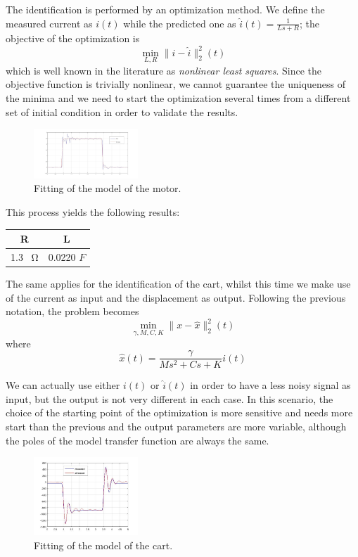 The identification is performed by an optimization method. We define the measured current as $i(t)$ while the predicted one as $\hat{i}(t) = \frac{1}{Ls+R}$; the objective of the optimization is
\begin{equation}
\min_{L,R} \|i-\hat{i}\|_2^2(t)
\end{equation}
which is well known in the literature as \emph{nonlinear least squares}. Since the objective function is trivially nonlinear, we cannot guarantee the uniqueness of the minima and we need to start the optimization several times from a different set of initial condition in order to validate the results.\\

\begin{figure}[h]
\centering
\includegraphics[width=0.35\textwidth]{img/graybox_motor.jpg}
\caption{Fitting of the model of the motor.}
\end{figure}

This process yields the following results:\\

\begin{table}[h]
\centering
\begin{tabular}{|c|c|}
R & L \\
\hline
1.3 \SI{}{\ohm}  & 0.0220 $F$ \\
\end{tabular}
\end{table}

The same applies for the identification of the cart, whilst this time we make use of the current as input and the displacement as output. Following the previous notation, the problem becomes
\begin{equation}
\min_{\gamma,M,C,K} \|x-\hat{x}\|_2^2(t)
\end{equation}
where
\begin{equation}
\hat{x}(t) = \frac{\gamma}{Ms^2+Cs+K} i(t)
\end{equation}

We can actually use either $i(t)$ or $\hat{i}(t)$ in order to have a less noisy signal as input, but the output is not very different in each case. In this scenario, the choice of the starting point of the optimization is more sensitive and needs more start than the previous and the output parameters are more variable, although the poles of the model transfer function are always the same.
\begin{figure}[h]
\centering
\includegraphics[width=0.35\textwidth]{img/graybox_cart.jpg}
\caption{Fitting of the model of the cart.}
\end{figure}

